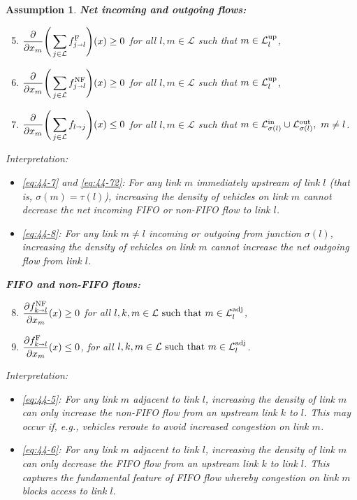 \documentclass[letterpaper, 10 pt, conference]{ieeeconf}
\newcommand{\sra}{\shortrightarrow}
\newtheorem{assum}{Assumption}
\newcommand{\Links}{\mathcal{L}}
\newcommand{\Lin}{\mathcal{L}^\textnormal{in}}
\newcommand{\Lout}{\mathcal{L}^\textnormal{out}}
\newcommand{\Lup}{\mathcal{L}^\textnormal{up}}
\newcommand{\Ladj}{\mathcal{L}^\textnormal{adj}}
\newcommand{\head}{{\sigma}}
\newcommand{\tail}{{\tau}}
\begin{document}
\begin{assum}
\noindent \textbf{Net incoming and outgoing flows:}
\begin{enumerate}[label={(A\arabic*)},labelindent=*,leftmargin=*,itemsep=2pt]
\setcounter{enumi}{4}
\item \label{eq:44-7} $\displaystyle\frac{\partial }{\partial x_m}\Bigg(\sum_{j\in\Links}\fF_{j\sra l}\Bigg) (x)\geq 0$ for all $l,m\in\Links$ such that $m\in\Lup_l$,
\item \label{eq:44-72} $\displaystyle\frac{\partial }{\partial x_m}\Bigg(\sum_{j\in\Links}\fNF_{j\sra l}\Bigg) (x)\geq 0$ for all $l,m\in\Links$ such that $m\in\Lup_l$,
\item \label{eq:44-8}  $\displaystyle\frac{\partial }{\partial x_m}\Bigg(\sum_{j\in\Links}f_{l\sra j}\Bigg) (x)\leq 0$ for all $l,m\in\Links$ such that $m\in \Lin_{\head(l)}\cup\Lout_{\head(l)}, \ m\neq l$.
  \end{enumerate}
Interpretation:
\begin{itemize}[leftmargin=*]
\item \ref{eq:44-7} and \ref{eq:44-72}: For any link $m$ immediately upstream of link $l$ (that is, $\head(m)=\tail(l)$), increasing the density of vehicles on link $m$ cannot decrease the net incoming FIFO or non-FIFO flow to link $l$.
\item \ref{eq:44-8}: For any link $m\neq l$ incoming or outgoing from junction $\head(l)$, increasing the density of vehicles on link $m$ cannot increase the net outgoing flow from link $l$.
\end{itemize}
\noindent \textbf{FIFO and non-FIFO flows:}
\begin{enumerate}[label={(A\arabic*)},labelindent=*,leftmargin=*]
\setcounter{enumi}{7}
\item \label{eq:44-5} $\displaystyle\frac{\partial \fNF_{k \sra l}}{\partial x_m}(x) \geq 0$ for all $ l,k,m\in\Links \text{ such that } m\in\Ladj_l$,
\item \label{eq:44-6} $\displaystyle\frac{\partial \fF_{k \sra l}}{\partial x_m}(x) \leq 0$, for all $l,k,m\in\Links \text{ such that } m\in\Ladj_l$.
  \end{enumerate}
Interpretation:
\begin{itemize}[leftmargin=*]
\item \ref{eq:44-5}: For any link $m$ adjacent to link $l$, increasing the density of link $m$ can only increase the non-FIFO flow from an upstream link $k$ to $l$. This may occur if, \emph{e.g.}, vehicles reroute to avoid increased congestion on link $m$.
\item \ref{eq:44-6}: For any link $m$ adjacent to link $l$, increasing the density of link $m$ can only decrease the FIFO flow from an upstream link $k$ to link $l$. This captures the fundamental feature of FIFO flow whereby congestion on link $m$ blocks access to link $l$.
\end{itemize}
\end{assum}
\end{document}
